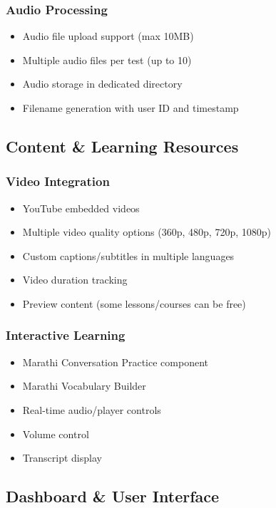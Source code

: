 \documentclass{article}
\begin{document}
\subsubsection{Audio Processing}
\begin{itemize}
    \item Audio file upload support (max 10MB)
    \item Multiple audio files per test (up to 10)
    \item Audio storage in dedicated directory
    \item Filename generation with user ID and timestamp
\end{itemize}

\subsection{Content \& Learning Resources}

\subsubsection{Video Integration}
\begin{itemize}
    \item YouTube embedded videos
    \item Multiple video quality options (360p, 480p, 720p, 1080p)
    \item Custom captions/subtitles in multiple languages
    \item Video duration tracking
    \item Preview content (some lessons/courses can be free)
\end{itemize}

\subsubsection{Interactive Learning}
\begin{itemize}
    \item Marathi Conversation Practice component
    \item Marathi Vocabulary Builder
    \item Real-time audio/player controls
    \item Volume control
    \item Transcript display
\end{itemize}

\subsection{Dashboard \& User Interface}
\end{document}
